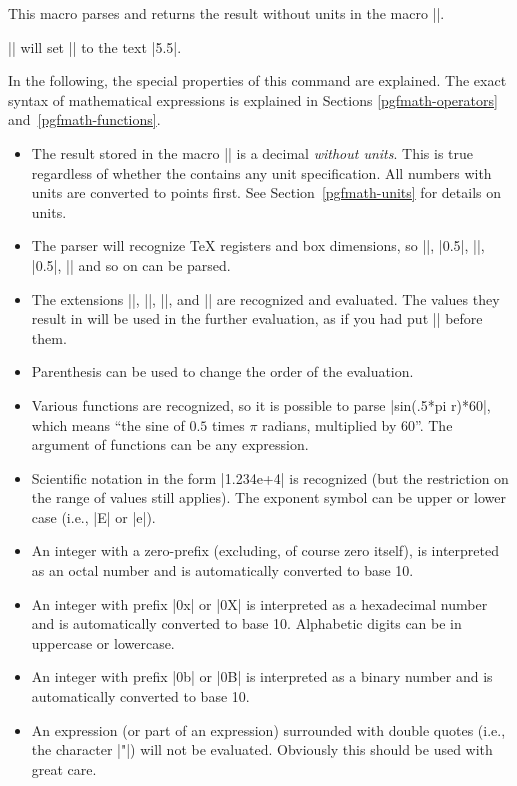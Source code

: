 \begin{command}{\pgfmathparse{}}
    This macro parses  and returns the result without units in
    the macro |\pgfmathresult|.

    \example |\pgfmathparse{2pt+3.5pt}| will set |\pgfmathresult| to the text
    |5.5|.

    In the following, the special properties of this command are explained. The
    exact syntax of mathematical expressions is explained in Sections
    \ref{pgfmath-operators} and~\ref{pgfmath-functions}.
    \begin{itemize}
        \item The result stored in the macro |\pgfmathresult| is a decimal
            \emph{without units}. This is true regardless of whether the
             contains any unit specification. All numbers with
            units are converted to points first. See
            Section~\ref{pgfmath-units} for details on units.
        \item The parser will recognize \TeX{} registers and box dimensions, so
            |\mydimen|, |0.5\mydimen|, |\wd\mybox|, |0.5\dp\mybox|,
            |\mycount\mydimen| and so on can be parsed.
        \item The  extensions |\dimexpr|, |\numexpr|,
            |\glueexpr|, and |\muexpr| are recognized and evaluated. The values
            they result in will be used in the further evaluation, as if you
            had put |\the| before them.
        \item Parenthesis can be used to change the order of the evaluation.
        \item Various functions are recognized, so it is possible to parse
            |sin(.5*pi r)*60|, which means ``the sine of $0.5$ times $\pi$
            radians, multiplied by 60''. The argument of functions can be any
            expression.
        \item Scientific notation in the form |1.234e+4| is recognized (but the
            restriction on the range of values still applies). The exponent
            symbol can be upper or lower case (i.e., |E| or |e|).
        \item An integer with a zero-prefix (excluding, of course zero itself),
            is interpreted as an octal number and is automatically converted to
            base 10.
        \item An integer with prefix |0x| or |0X| is interpreted as a
            hexadecimal number and is automatically converted to base 10.
            Alphabetic digits can be in uppercase or lowercase.
        \item An integer with prefix |0b| or |0B| is interpreted as a binary
            number and is automatically converted to base 10.
        \item An expression (or part of an expression) surrounded with double
            quotes (i.e., the character |"|) will not be evaluated. Obviously
            this should be used with great care.
    \end{itemize}
\end{command}

